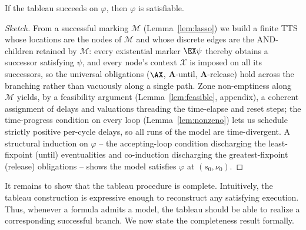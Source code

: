 \begin{theorem}[Soundness]\label{thm:soundness}
If the tableau succeeds on $\varphi$, then $\varphi$ is satisfiable.
\end{theorem}

\begin{proof}[Sketch]
From a successful marking $\mathcal{M}$ (Lemma~\ref{lem:lasso}) we build a finite TTS whose locations are the nodes of $\mathcal{M}$ and whose discrete edges are the AND-children retained by $\mathcal{M}$: every existential marker $\EX\psi$ thereby obtains a successor satisfying $\psi$, and every node's context $\mathcal{X}$ is imposed on {all} its successors, so the universal obligations ($\AX$, $\mathbf{A}$-until, $\mathbf{A}$-release) hold across the branching rather than vacuously along a single path. Zone non-emptiness along $\mathcal{M}$ yields, by a feasibility argument (Lemma~\ref{lem:feasible}, appendix), a coherent assignment of delays and valuations threading the time-elapse and reset steps; the time-progress condition on every loop (Lemma~\ref{lem:nonzeno}) lets us schedule strictly positive per-cycle delays, so all runs of the model are time-divergent. A structural induction on $\varphi$ -- the accepting-loop condition discharging the least-fixpoint (until) eventualities and co-induction discharging the greatest-fixpoint (release) obligations -- shows the model satisfies $\varphi$ at $(s_0,\nu_0)$.
\end{proof}


It remains to show that the tableau procedure is complete. Intuitively, the tableau construction is expressive enough to reconstruct any satisfying execution. Thus, whenever a formula admits a model, the tableau should be able to realize a corresponding successful branch. We now state the completeness result formally.




